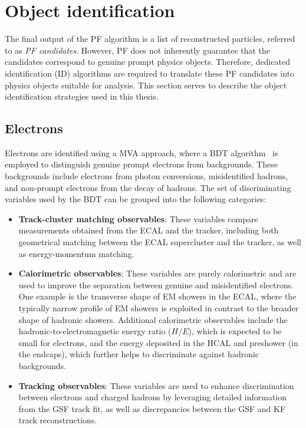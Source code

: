 \section{Object identification}
\label{Section:Chapter4_Object_Identification}

The final output of the PF algorithm is a list of reconstructed particles, referred to as \textit{PF candidates}. However, PF does not inherently guarantee that the candidates correspond to genuine prompt physics objects. Therefore, dedicated identification (ID) algorithms are required to translate these PF candidates into physics objects suitable for analysis. This section serves to describe the object identification strategies used in this thesis.

\subsection{Electrons}
\label{Section:Electron_Identification}

Electrons are identified using a \ac{MVA} approach, where a \ac{BDT} algorithm~\cite{Electron_ID} is employed to distinguish genuine prompt electrons from backgrounds. These backgrounds include electrons from photon conversions, misidentified hadrons, and non-prompt electrons from the decay of hadrons. The set of discriminating variables used by the BDT can be grouped into the following categories:

\begin{itemize}
    \item \textbf{Track-cluster matching observables}: These variables compare measurements obtained from the \ac{ECAL} and the tracker, including both geometrical matching between the \ac{ECAL} supercluster and the tracker, as well as energy-momentum matching.
    \item \textbf{Calorimetric observables}: These variables are purely calorimetric and are used to improve the separation between genuine and misidentified electrons. One example is the transverse shape of EM showers in the \ac{ECAL}, where the typically narrow profile of EM showers is exploited in contrast to the broader shape of hadronic showers. Additional calorimetric observables include the hadronic-to-electromagnetic energy ratio ($H/E$), which is expected to be small for electrons, and the energy deposited in the \ac{HCAL} and preshower (in the endcaps), which further helps to discriminate against hadronic backgrounds.
    \item \textbf{Tracking observables}: These variables are used to enhance discrimination between electrons and charged hadrons by leveraging detailed information from the GSF track fit, as well as discrepancies between the GSF and KF track reconstructions.
\end{itemize}

